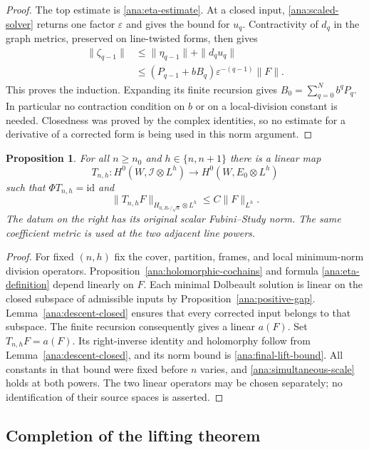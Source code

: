 \documentclass[11pt,reqno]{amsart}
\numberwithin{equation}{section}
\newtheorem{proposition}[theorem]{Proposition}
\theoremstyle{definition}
\theoremstyle{remark}
\newcommand{\cI}{\mathcal I}
\newcommand{\id}{\mathrm{id}}
\begin{document}
\begin{proof}
The top estimate is \eqref{ana:eta-estimate}.  At a closed input,
\eqref{ana:scaled-solver} returns one factor $\varepsilon$ and
gives the bound for $u_q$.  Contractivity of $d_q$ in the graph
metrics, preserved on line-twisted forms, then gives
\begin{align*}
 \|\zeta_{q-1}\|
 &\leq\|\eta_{q-1}\|+\|d_qu_q\|\\
 &\leq(P_{q-1}+bB_q)\varepsilon^{-(q-1)}\|F\|.
\end{align*}
This proves the induction.  Expanding its finite recursion gives
$B_0=\sum_{q=0}^N b^qP_q$.  In particular no contraction condition
on $b$ or on a local-division constant is needed.  Closedness was
proved by the complex identities, so no estimate for a derivative
of a corrected form is being used in this norm argument.
\end{proof}

\begin{proposition}\label{ana:global-lift}
For all $n\geq n_0$ and $h\in\{n,n+1\}$ there is a linear map
\[
 T_{n,h}:H^0(W,\cI\otimes L^h)
 \longrightarrow H^0(W,E_0\otimes L^h)
\]
such that $\Phi T_{n,h}=\id$ and
\[
 \|T_{n,h}F\|_{H_{0,R_*/\sqrt n}\otimes L^h}
 \leq C\|F\|_{L^h}.
\]
The datum on the right has its original scalar Fubini--Study norm.
The same coefficient metric is used at the two adjacent line powers.
\end{proposition}

\begin{proof}
For fixed $(n,h)$ fix the cover, partition, frames, and local
minimum-norm division operators.  Proposition~\ref{ana:holomorphic-cochains}
and formula \eqref{ana:eta-definition} depend linearly on $F$.
Each minimal Dolbeault solution is linear on the closed subspace of
admissible inputs by Proposition~\ref{ana:positive-gap}.
Lemma~\ref{ana:descent-closed} ensures that every corrected input
belongs to that subspace.  The finite recursion consequently gives
a linear $a(F)$.  Set $T_{n,h}F=a(F)$.  Its right-inverse identity
and holomorphy follow from Lemma~\ref{ana:descent-closed}, and its
norm bound is \eqref{ana:final-lift-bound}.  All constants in that
bound were fixed before $n$ varies, and
\eqref{ana:simultaneous-scale} holds at both powers.
The two linear operators may be chosen separately; no identification
of their source spaces is asserted.
\end{proof}

\subsection{Completion of the lifting theorem}
\end{document}
